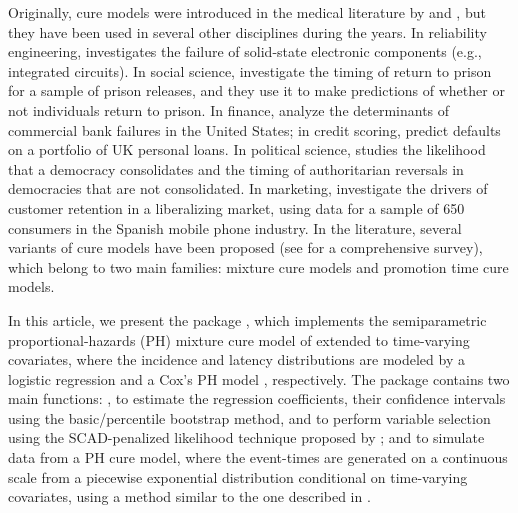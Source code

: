 Originally, cure models were introduced in the medical literature by \citet{Boag_1949} and \citet{Berkson_Gage_1952}, but they have been used in several other disciplines during the years.
In reliability engineering, \citet{Meeker_1987} investigates the failure of solid-state electronic components (e.g., integrated circuits).
In social science, \citet{Schmidt_Witte_1989} investigate the timing of return to prison for a sample of prison releases, and they use it to make predictions of whether or not individuals return to prison.
In finance, \citet{Cole_Gunther_1995} analyze the determinants of commercial bank failures in the United States; in credit scoring, \citet{Tong_2012} predict defaults on a portfolio of UK personal loans. 
In political science, \citet{Svolik_2008} studies the likelihood that a democracy consolidates and the timing of authoritarian reversals in democracies that are not consolidated.
In marketing, \citet{Polo_2011} investigate the drivers of customer retention in a liberalizing market, using data for a sample of 650 consumers in the Spanish mobile phone industry.
In the literature, several variants of cure models have been proposed (see \citet{Amico_2018} for a comprehensive survey), which belong to two main families: mixture cure models and promotion time cure models.

In this article, we present the  package \citep{penPHcure}, which implements
the semiparametric proportional-hazards (PH) mixture cure model of \citet{Sy_Taylor_2000} extended to time-varying covariates, where the incidence and latency distributions are modeled by a logistic regression and a Cox’s PH model \citep{Cox_1972}, respectively.
The  package contains two main functions: , to estimate the regression coefficients, their confidence intervals using the basic/percentile bootstrap method, and to perform variable selection using the SCAD-penalized likelihood technique proposed by \citet{Beretta_Heuchenne_2019}; and  to simulate data from a PH cure model, where the event-times are generated on a continuous scale from a piecewise exponential distribution conditional on time-varying covariates, using a method similar to the one described in \citet{Hendry_2014}.


